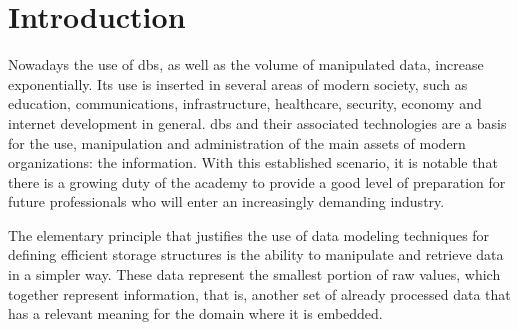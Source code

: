 \chapter{Introduction}
\label{chap:introduction}

Nowadays the use of \acp{db}, as well as the volume of manipulated data, increase exponentially.
Its use is inserted in several areas of modern society, such as education, communications, infrastructure, healthcare, security, economy and internet development in general.
\acp{db} and their associated technologies are a basis for the use, manipulation and administration of the main assets of modern organizations: the information.
With this established scenario, it is notable that there is a growing duty of the academy to provide a good level of preparation for future professionals who will enter an increasingly demanding industry.

The elementary principle that justifies the use of data modeling techniques for defining efficient storage structures is the ability to manipulate and retrieve data in a simpler way.
These data represent the smallest portion of raw values, which together represent information, that is, another set of already processed data that has a relevant meaning for the domain where it is embedded.


